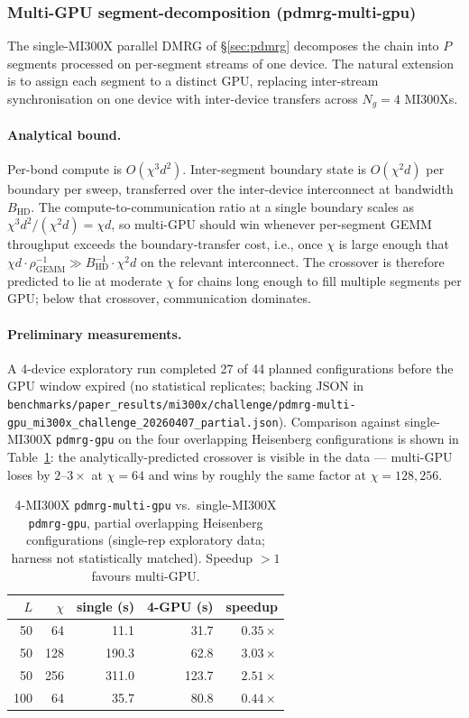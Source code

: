 \documentclass[preprint,12pt]{elsarticle}
\begin{document}
\subsubsection{Multi-GPU segment-decomposition (pdmrg-multi-gpu)}
\label{sec:multi_gpu}

The single-MI300X parallel DMRG of \S\ref{sec:pdmrg} decomposes the chain into $P$ segments processed on per-segment streams of one device.  The natural extension is to assign each segment to a distinct GPU, replacing inter-stream synchronisation on one device with inter-device transfers across $N_g{=}4$ MI300Xs.

\paragraph{Analytical bound.}  Per-bond compute is $O(\chi^3 d^2)$.  Inter-segment boundary state is $O(\chi^2 d)$ per boundary per sweep, transferred over the inter-device interconnect at bandwidth $B_\text{HD}$.  The compute-to-communication ratio at a single boundary scales as $\chi^3 d^2 / (\chi^2 d) = \chi d$, so multi-GPU should win whenever per-segment GEMM throughput exceeds the boundary-transfer cost, i.e., once $\chi$ is large enough that $\chi d \cdot \rho_\text{GEMM}^{-1} \gg B_\text{HD}^{-1} \cdot \chi^2 d$ on the relevant interconnect.  The crossover is therefore predicted to lie at moderate $\chi$ for chains long enough to fill multiple segments per GPU; below that crossover, communication dominates.

\paragraph{Preliminary measurements.}  A 4-device exploratory run completed 27 of 44 planned configurations before the GPU window expired (no statistical replicates; backing JSON in \texttt{benchmarks/paper\_results/mi300x/challenge/pdmrg-multi-gpu\_mi300x\_challenge\_20260407\_partial.json}).  Comparison against single-MI300X \texttt{pdmrg-gpu} on the four overlapping Heisenberg configurations is shown in Table~\ref{tab:multi_gpu}: the analytically-predicted crossover is visible in the data --- multi-GPU loses by $2\text{--}3\times$ at $\chi{=}64$ and wins by roughly the same factor at $\chi{=}128, 256$.

\begin{table}[h]
\centering
\caption{4-MI300X \texttt{pdmrg-multi-gpu} vs.\ single-MI300X \texttt{pdmrg-gpu}, partial overlapping Heisenberg configurations (single-rep exploratory data; harness not statistically matched). Speedup $> 1$ favours multi-GPU.}
\label{tab:multi_gpu}
\begin{tabular}{rrrrr}
\toprule
$L$ & $\chi$ & single (s) & 4-GPU (s) & speedup \\
\midrule
50  & 64  & 11.1  & 31.7  & $0.35\times$ \\
50  & 128 & 190.3 & 62.8  & $\mathbf{3.03\times}$ \\
50  & 256 & 311.0 & 123.7 & $\mathbf{2.51\times}$ \\
100 & 64  & 35.7  & 80.8  & $0.44\times$ \\
\bottomrule
\end{tabular}
\end{table}
\end{document}
